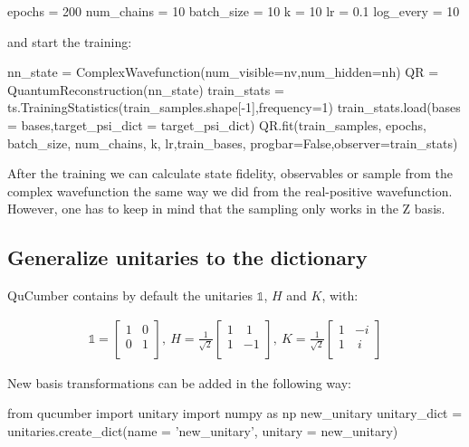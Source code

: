 \documentclass[submission, Phys]{SciPost}
\begin{document}
\begin{python}
epochs     = 200
num_chains = 10
batch_size = 10
k          = 10
lr         = 0.1
log_every  = 10
\end{python}

and start the training:

\begin{python}
nn_state = ComplexWavefunction(num_visible=nv,num_hidden=nh)
QR = QuantumReconstruction(nn_state)
train_stats = ts.TrainingStatistics(train_samples.shape[-1],frequency=1)
train_stats.load(bases = bases,target_psi_dict = target_psi_dict)
QR.fit(train_samples, epochs, batch_size, num_chains, k,
       lr,train_bases, progbar=False,observer=train_stats)
\end{python}

After the training we can calculate state fidelity, observables or sample from the complex wavefunction 
the same way we did from the real-positive wavefunction. However, one has to keep in mind that the sampling only works in the Z basis.

\subsection{Generalize unitaries to the dictionary}

QuCumber contains by default the unitaries $\mathds{1}$, $H$ and $K$, with:

\begin{align}
\mathds{1} = 
\begin{bmatrix}
1 &0 \\
0 &1 \\ 
\end{bmatrix},~
H = \frac{1}{\sqrt{2}} 
\begin{bmatrix}
1 &~1 \\
1 &-1 \\ 
\end{bmatrix},~
K = \frac{1}{\sqrt{2}} 
\begin{bmatrix}
1 &-i \\
1 &~i \\ 
\end{bmatrix}
\end{align} 

New basis transformations can be added in the following way:

\begin{python}
from qucumber import unitary
import numpy as np
new_unitary
unitary_dict = unitaries.create_dict(name = 'new_unitary', unitary = new_unitary)
\end{python}
\end{document}
